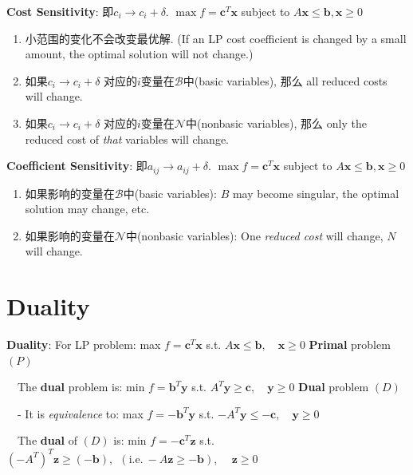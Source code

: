 \documentclass[9pt]{article}
\begin{document}
\textbf{Cost Sensitivity}: 即$c_i\to c_i+\delta$. \quad $\max f=\mathbf{c}^T\mathbf{x}$ subject to $A\mathbf{x}\leq \mathbf{b},\mathbf{x}\geq0$

\begin{enumerate}[itemsep=-2pt, topsep=-2pt]
    \item 小范围的变化不会改变最优解. {\scriptsize (If an LP cost coefficient is changed by a small amount, the optimal solution will not change.)}
    \item 如果$c_i\to c_i+\delta$ 对应的$i$变量在$\mathcal{B}$中(basic variables), 那么 all reduced costs will change.
    \item 如果$c_i\to c_i+\delta$ 对应的$i$变量在$\mathcal{N}$中(nonbasic variables), 那么 only the reduced cost of \textit{that} variables will change.
\end{enumerate}

\textbf{Coefficient Sensitivity}: 即$a_{ij}\to a_{ij}+\delta$. \quad $\max f=\mathbf{c}^T\mathbf{x}$ subject to $A\mathbf{x}\leq \mathbf{b},\mathbf{x}\geq0$

\begin{enumerate}[itemsep=-2pt, topsep=-2pt]
    \item 如果影响的变量在$\mathcal{B}$中(basic variables): $B$ may become singular, the optimal solution may change, etc.
    \item 如果影响的变量在$\mathcal{N}$中(nonbasic variables): One \textit{reduced cost} will change, $N$ will change.
\end{enumerate}


\section{Duality} %

\textbf{Duality}: For LP problem: max $f=\mathbf{c}^T\mathbf{x}$ \quad s.t. $A\mathbf{x}\leq \mathbf{b}, \quad\mathbf{x}\geq0$ \quad \textbf{Primal} problem \qquad $(P)$

\qquad \ \ The \textbf{dual} problem is: min $f=\mathbf{b}^T\mathbf{y}$ \quad s.t. $A^T\mathbf{y}\geq \mathbf{c}, \quad\mathbf{y}\geq0$ \quad \textbf{Dual} problem \qquad $(D)$

\qquad \ \ - It is \textit{equivalence} to: max $f=-\mathbf{b}^T\mathbf{y}$ \quad s.t. $-A^T\mathbf{y}\leq -\mathbf{c}, \quad\mathbf{y}\geq0$

\qquad \ \ The \textbf{dual} of $(D)$ is: min $f=-\mathbf{c}^T\mathbf{z}$ \quad s.t. $(-A^T)^T\mathbf{z}\geq (-\mathbf{b}), \ \ (\text{i.e.} \ -A\mathbf{z}\geq -\mathbf{b})$, $\quad\mathbf{z}\geq0$
\end{document}
